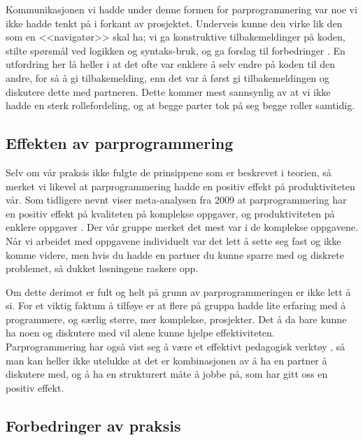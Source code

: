 Kommunikasjonen vi hadde under denne formen for parprogrammering var noe vi ikke hadde tenkt på i forkant av prosjektet.
Underveis kunne den virke lik den som en <<navigatør>> skal ha; vi ga konstruktive tilbakemeldinger på koden, stilte spørsmål ved logikken og syntaks-bruk, og ga forslag til forbedringer \cite{McDowell2006}.
En utfordring her lå heller i at det ofte var enklere å selv endre på koden til den andre, for så å gi tilbakemelding, enn det var å først gi tilbakemeldingen og diskutere dette med partneren.
Dette kommer mest sannsynlig av at vi ikke hadde en sterk rollefordeling, og at begge parter tok på seg begge roller samtidig.

\subsection{Effekten av parprogrammering}

Selv om vår praksis ikke fulgte de prinsippene som er beskrevet i teorien, så merket vi likevel at parprogrammering hadde en positiv effekt på produktiviteten vår.
Som tidligere nevnt viser meta-analysen fra 2009 at parprogrammering har en positiv effekt på kvaliteten på komplekse oppgaver, og produktiviteten på enklere oppgaver \cite{hannay2009}.
Der vår gruppe merket det mest var i de komplekse oppgavene.
Når vi arbeidet med oppgavene individuelt var det lett å sette seg fast og ikke komme videre, men hvis du hadde en partner du kunne sparre med og diskrete problemet, så dukket løsningene raskere opp.

Om dette derimot er fult og helt på grunn av parprogrammeringen er ikke lett å si.
For et viktig faktum å tilføye er at flere på gruppa hadde lite erfaring med å programmere, og særlig større, mer komplekse, prosjekter.
Det å da bare kunne ha noen og diskutere med vil alene kunne hjelpe effektiviteten.
Parprogrammering har også vist seg å være et effektivt pedagogisk verktøy \cite{McDowell2006}, så man kan heller ikke utelukke at det er kombinasjonen av å ha en partner å diskutere med, og å ha en strukturert måte å jobbe på, som har gitt oss en positiv effekt.

\subsection{Forbedringer av praksis}

